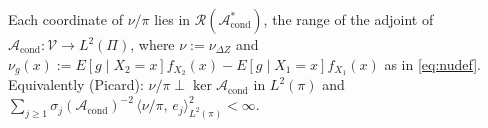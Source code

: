 %
%


\begin{assumption}\label{ass:sourcecond}
Each coordinate of $\nu/\pi$ lies in $\mathcal R(\mathcal A^\ast_{\mathrm{cond}})$, the range of the
adjoint of $\mathcal A_{\mathrm{cond}}:\mathcal V\to L^{2}(\Pi)$, where $\nu:=\nu_{\Delta Z}$ and
$\nu_g(x):=E[g\mid X_2=x]f_{X_2}(x)-E[g\mid X_1=x]f_{X_1}(x)$ as in \eqref{eq:nudef}. Equivalently
(Picard):
$\nu/\pi\perp\ker\mathcal A_{\mathrm{cond}}$ in $L^{2}(\pi)$ and
$\sum_{j\ge1}\sigma_j(\mathcal A_{\mathrm{cond}})^{-2}\,\langle\nu/\pi,\,e_j\rangle_{L^{2}(\pi)}^{2}<\infty$.
\end{assumption}


